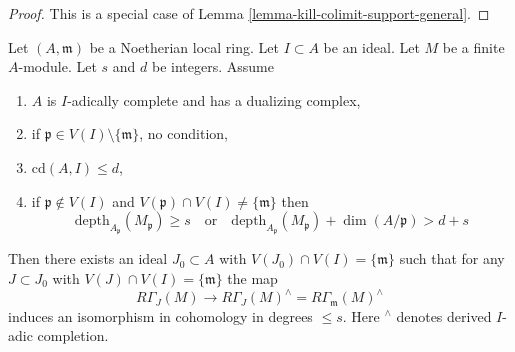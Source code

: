 \begin{proof}
This is a special case of Lemma \ref{lemma-kill-colimit-support-general}.
\end{proof}

\begin{lemma}
\label{lemma-algebraize-local-cohomology}
Let $(A, \mathfrak m)$ be a Noetherian local ring.
Let $I \subset A$ be an ideal. Let $M$ be a finite $A$-module.
Let $s$ and $d$ be integers. Assume
\begin{enumerate}
\item $A$ is $I$-adically complete and has a dualizing complex,
\item if $\mathfrak p \in V(I) \setminus \{\mathfrak m\}$, no condition,
\item $\text{cd}(A, I) \leq d$,
\item if $\mathfrak p \not \in V(I)$ and
$V(\mathfrak p) \cap V(I) \not = \{\mathfrak m\}$ then
$$
\text{depth}_{A_\mathfrak p}(M_\mathfrak p) \geq s
\quad\text{or}\quad
\text{depth}_{A_\mathfrak p}(M_\mathfrak p) + \dim(A/\mathfrak p) > d + s
$$
\end{enumerate}
Then there exists an ideal $J_0 \subset A$ with
$V(J_0) \cap V(I) = \{\mathfrak m\}$ such that for any $J \subset J_0$ with
$V(J) \cap V(I) = \{\mathfrak m\}$ the map
$$
R\Gamma_J(M) \longrightarrow
R\Gamma_J(M)^\wedge = R\Gamma_\mathfrak m(M)^\wedge
$$
induces an isomorphism in cohomology in degrees $\leq s$.
Here ${}^\wedge$ denotes derived $I$-adic completion.
\end{lemma}

